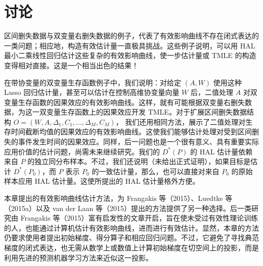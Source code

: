 \section{讨论}

\begin{sourcebox}
区间删失数据与双变量右删失数据的例子，代表了有效影响曲线不存在闭式表达的一类问题；相应地，构造有效估计量一直极具挑战。这些例子说明，可以用 HAL 最小二乘线性回归估计这些复杂的有效影响曲线，使一步估计量或 TMLE 的构造变得相对直接。这是一个相当出色的结果！
\end{sourcebox}

在带协变量的双变量生存函数例子中，我们说明：对给定 $(A,W)$ 使用这种 Lasso 回归估计量，甚至可以估计在控制高维协变量向量 $W$ 后，二值处理 $A$ 对双变量生存函数的因果效应的有效影响曲线。这样，就有可能根据双变量右删失数据，为这一双变量生存函数上的因果效应开发 TMLE。对于扩展区间删失数据结构
$O=(W,A,\Delta_1,C_1,\ldots,\Delta_M,C_M)$，
我们还用相同方法，展示了二值处理对生存时间截断均值的因果效应的有效影响曲线。这使我们能够估计处理对受到区间删失的事件发生时间的因果效应。同样，后一问题也是一个很有意义、具有重要实际应用价值的估计问题，尚需未来继续研究。我们的 $D^*(P)$ 的 HAL 估计量依赖来自 $P$ 的独立同分布样本。不过，我们还说明（未给出正式证明），如果目标是估计 $D^*(P_0)$，而 $P$ 表示 $P_0$ 的一致估计量，那么，也可以直接对来自 $P_0$ 的原始样本应用 HAL 估计量。这使所提出的 HAL 估计量格外方便。

本章提出的有效影响曲线估计方法，为 Frangakis 等（2015）、Luedtke 等（2015a）以及 van der Laan 等（2015）提出的方法提供了另一种选择。后一类研究由 Frangakis 等（2015）富有启发性的文章开启，旨在使未受过有效性理论训练的人，也能通过计算机估计有效影响曲线，进而进行有效估计。显然，本章的方法仍要求使用者提出初始梯度、得分算子和相应回归问题。不过，它避免了寻找典范梯度的闭式表达，也无需从数学上或数值上计算初始梯度在切空间上的投影，而是利用先进的预测机器学习方法来近似这一投影。
